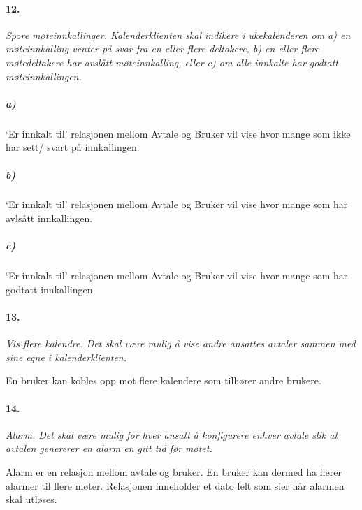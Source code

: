 \documentclass[titlepage]{article}
\begin{document}
\paragraph{12.}\textit{ Spore møteinnkallinger. Kalenderklienten skal indikere i ukekalenderen om a) en
møteinnkalling venter på svar fra en eller flere deltakere, b) en eller flere
møtedeltakere har avslått møteinnkalling, eller c) om alle innkalte har godtatt
møteinnkallingen.}
\subparagraph{a)} ‘Er innkalt til’ relasjonen mellom Avtale og Bruker vil vise hvor mange som ikke har sett/ svart på innkallingen.

\subparagraph{b)} ‘Er innkalt til’ relasjonen mellom Avtale og Bruker vil vise hvor mange som har avlsått innkallingen.

\subparagraph{c)} ‘Er innkalt til’ relasjonen mellom Avtale og Bruker vil vise hvor mange som har godtatt innkallingen.

\paragraph{13.}\textit{ Vis flere kalendre. Det skal være mulig å vise andre ansattes avtaler sammen med sine
egne i kalenderklienten.}

En bruker kan kobles opp mot flere kalendere som tilhører andre brukere.


\paragraph{14.}\textit{ Alarm. Det skal være mulig for hver ansatt å konfigurere enhver avtale slik at avtalen
genererer en alarm en gitt tid før møtet.}

Alarm er en relasjon mellom avtale og bruker. En bruker kan dermed ha flerer alarmer til flere møter. Relasjonen inneholder et dato felt som sier når alarmen skal utløses.
\end{document}
